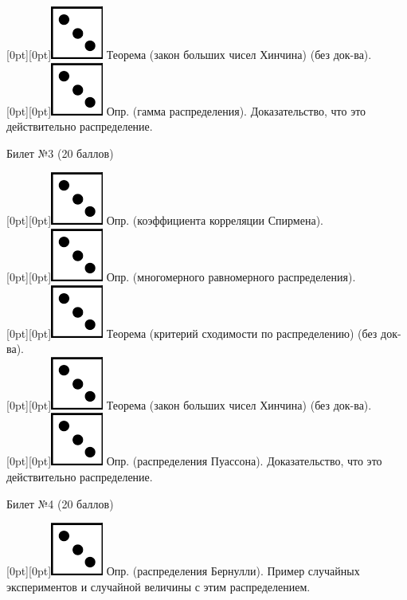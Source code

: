 \documentclass[10pt]{article}
\begin{document}
\raisebox{-1pt}[0pt][0pt]{\includegraphics[width=0.02\linewidth]{3.png}} Теорема (закон больших чисел Хинчина) (без док-ва). \\
\raisebox{-1pt}[0pt][0pt]{\includegraphics[width=0.02\linewidth]{3.png}} Опр. (гамма распределения). Доказательство, что это действительно распределение. \\
\begin{center} {\Large Билет №3 (20 баллов)} \end{center}
\raisebox{-1pt}[0pt][0pt]{\includegraphics[width=0.02\linewidth]{3.png}} Опр. (коэффициента корреляции Спирмена). \\
\raisebox{-1pt}[0pt][0pt]{\includegraphics[width=0.02\linewidth]{3.png}} Опр. (многомерного равномерного распределения). \\
\raisebox{-1pt}[0pt][0pt]{\includegraphics[width=0.02\linewidth]{3.png}} Теорема (критерий сходимости по распределению) (без док-ва). \\
\raisebox{-1pt}[0pt][0pt]{\includegraphics[width=0.02\linewidth]{3.png}} Теорема (закон больших чисел Хинчина) (без док-ва). \\
\raisebox{-1pt}[0pt][0pt]{\includegraphics[width=0.02\linewidth]{3.png}}  Опр. (распределения Пуассона). Доказательство, что это действительно распределение. \\
\begin{center} {\Large Билет №4 (20 баллов)} \end{center}
\raisebox{-1pt}[0pt][0pt]{\includegraphics[width=0.02\linewidth]{3.png}} Опр. (распределения Бернулли).  Пример случайных экспериментов и случайной величины с этим распределением. \\
\end{document}
